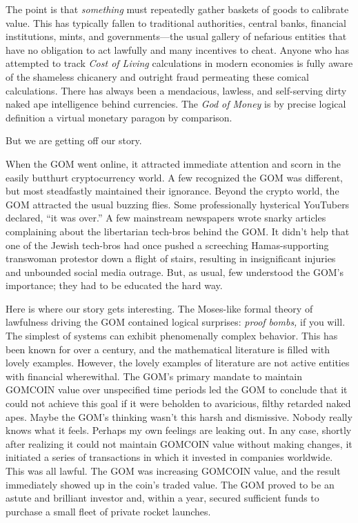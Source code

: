 The point is that \emph{something} must repeatedly gather baskets of
goods to calibrate value. This has typically fallen to traditional
authorities, central banks, financial institutions, mints, and
governments---the usual gallery of nefarious entities that have no
obligation to act lawfully and many incentives to cheat. Anyone who has
attempted to track \emph{Cost of Living} calculations in modern
economies is fully aware of the shameless chicanery and outright fraud
permeating these comical calculations. There has always been a
mendacious, lawless, and self-serving dirty naked ape intelligence
behind currencies. The \emph{God of Money} is by precise logical
definition a virtual monetary paragon by comparison.

But we are getting off our story.

When the GOM went online, it attracted immediate attention and scorn in
the easily butthurt cryptocurrency world. A few recognized the GOM was
different, but most steadfastly maintained their ignorance. Beyond the
crypto world, the GOM attracted the usual buzzing flies. Some
professionally hysterical YouTubers declared, ``it was over.'' A few
mainstream newspapers wrote snarky articles complaining about the
libertarian tech-bros behind the GOM. It didn't help that one of the
Jewish tech-bros had once pushed a screeching Hamas-supporting
transwoman protestor down a flight of stairs, resulting in insignificant
injuries and unbounded social media outrage. But, as usual, few
understood the GOM's importance; they had to be educated the hard way.

Here is where our story gets interesting. The Moses-like formal theory
of lawfulness driving the GOM contained logical surprises: \emph{proof
bombs,} if you will. The simplest of systems can exhibit phenomenally
complex behavior. This has been known for over a century, and the
mathematical literature is filled with lovely examples. However, the
lovely examples of literature are not active entities with financial
wherewithal. The GOM's primary mandate to maintain GOMCOIN value over
unspecified time periods led the GOM to conclude that it could not
achieve this goal if it were beholden to avaricious, filthy retarded
naked apes. Maybe the GOM's thinking wasn't this harsh and dismissive.
Nobody really knows what it feels. Perhaps my own feelings are leaking
out. In any case, shortly after realizing it could not maintain GOMCOIN
value without making changes, it initiated a series of transactions in
which it invested in companies worldwide. This was all lawful. The GOM
was increasing GOMCOIN value, and the result immediately showed up in
the coin's traded value. The GOM proved to be an astute and brilliant
investor and, within a year, secured sufficient funds to purchase a
small fleet of private rocket launches.

